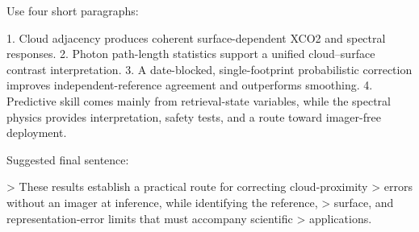 \conclusions  %


Use four short paragraphs:

1. Cloud adjacency produces coherent surface-dependent XCO2 and spectral
   responses.
2. Photon path-length statistics support a unified cloud–surface contrast
   interpretation.
3. A date-blocked, single-footprint probabilistic correction improves
   independent-reference agreement and outperforms smoothing.
4. Predictive skill comes mainly from retrieval-state variables, while the
   spectral physics provides interpretation, safety tests, and a route toward
   imager-free deployment.

Suggested final sentence:

> These results establish a practical route for correcting cloud-proximity
> errors without an imager at inference, while identifying the reference,
> surface, and representation-error limits that must accompany scientific
> applications.
